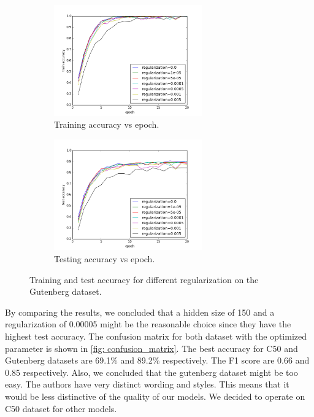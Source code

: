 \documentclass{article} %
\begin{document}
\begin{figure}[H]
\begin{subfigure}{0.5\linewidth}
\centering
\includegraphics[width=0.7\textwidth]{figures/epoch_train_accu_rg_g.png} 
\caption{Training accuracy vs epoch.}
\end{subfigure}
\begin{subfigure}{0.5\linewidth}
\centering
\includegraphics[width=0.7\textwidth]{figures/epoch_test_accu_rg_g.png} 
\caption{Testing accuracy vs epoch.}
\end{subfigure}
\caption{Training and test accuracy for different regularization on the Gutenberg dataset.}
\label{rg_test_accu_gutenberg_ag}
\end{figure}


By comparing the results, we concluded that a hidden size of 150 and a regularization of 0.00005 might be the reasonable choice since they have the highest test accuracy. The confusion matrix for both dataset with the optimized parameter is shown in \ref{fig: confusion_matrix}. The best accuracy for C50 and Gutenberg datasets are 69.1\% and 89.2\% respectively. The F1 score are 0.66 and 0.85 respectively. Also, we concluded that the gutenberg dataset might be too easy. The authors have very distinct wording and styles. This means that it would be less distinctive of the quality of our models. We decided to operate on C50 dataset for other models.
\end{document}

